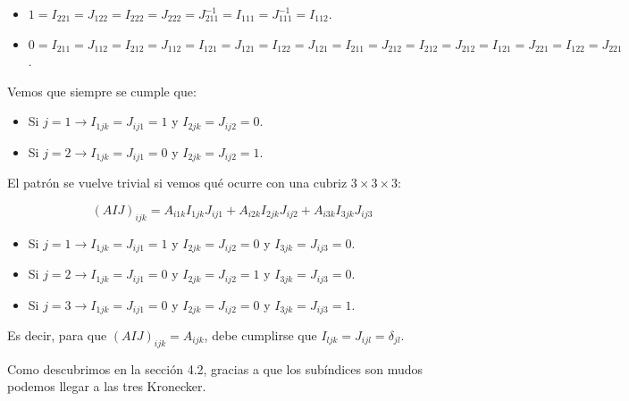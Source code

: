 \documentclass[a4paper, titlepage]{article}
\begin{document}
\begin{itemize}
	\item $1 = I_{221} = J_{122} = I_{222} = J_{222} = J_{211}^{-1} = I_{111} = J_{111}^{-1} = I_{112}$.
	\item $0 = I_{211} = J_{112} = I_{212} = J_{112} = I_{121} = J_{121} = I_{122} = J_{121} = I_{211} = J_{212} = I_{212} = J_{212} = I_{121} = J_{221} = I_{122} = J_{221}$.
\end{itemize}

Vemos que siempre se cumple que:

\begin{itemize}
	\item Si $j = 1 \rightarrow I_{1jk} = J_{ij1} = 1$ y $I_{2jk} = J_{ij2} = 0$.
	\item Si $j = 2 \rightarrow I_{1jk} = J_{ij1} = 0$ y $I_{2jk} = J_{ij2} = 1$.
\end{itemize}

El patrón se vuelve trivial si vemos qué ocurre con una cubriz $3 \times 3 \times 3$:

$$(AIJ)_{ijk} = A_{i1k} I_{1jk} J_{ij1} + A_{i2k} I_{2jk} J_{ij2} + A_{i3k} I_{3jk} J_{ij3}$$

\begin{itemize}
	\item Si $j = 1 \rightarrow I_{1jk} = J_{ij1} = 1$ y $I_{2jk} = J_{ij2} = 0$ y $I_{3jk} = J_{ij3} = 0$.
	\item Si $j = 2 \rightarrow I_{1jk} = J_{ij1} = 0$ y $I_{2jk} = J_{ij2} = 1$ y $I_{3jk} = J_{ij3} = 0$.
	\item Si $j = 3 \rightarrow I_{1jk} = J_{ij1} = 0$ y $I_{2jk} = J_{ij2} = 0$ y $I_{3jk} = J_{ij3} = 1$.
\end{itemize}

Es decir, para que $(AIJ)_{ijk} = A_{ijk}$, debe cumplirse que $I_{ljk} = J_{ijl} = \delta_{jl}$.

Como descubrimos en la sección 4.2, gracias a que los subíndices son mudos podemos llegar a las tres Kronecker.
\end{document}
